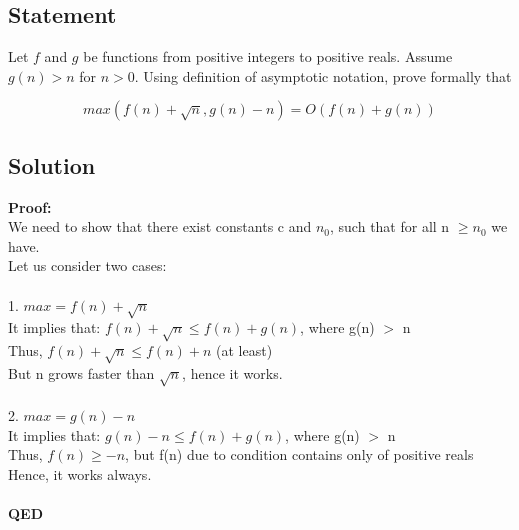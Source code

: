 \documentclass{article}
\begin{document}
\subsection{Statement}

Let \(f\) and \(g\) be functions from positive integers to positive reals. Assume \(g(n) > n\) for \(n > 0\). Using definition of asymptotic notation, prove formally that

\[max(f(n) + \sqrt{n}, g(n) - n) = O(f(n) + g(n))\]

\subsection{Solution}
\textbf{Proof:} \\

We need to show that there exist constants c and $n_0$, such that for all n $\geq n_0$ we have. \\
Let us consider two cases: \\ \\
1. $max = f(n) + \sqrt{n}$ \\
It implies that: $f(n) + \sqrt{n} \leq f(n) + g(n)$, where g(n) $>$ n \\
Thus, $f(n) + \sqrt{n} \leq f(n) + n$ (at least) \\
But n grows faster than $\sqrt{n}$, hence it works. \\ \\
2. $max = g(n) - n$ \\
It implies that: $g(n) - n \leq f(n) + g(n)$, where g(n) $>$ n \\
Thus, $f(n) \geq -n$, but f(n) due to condition contains only of positive reals \\
Hence, it works always. \\ \\
\textbf{QED}
\end{document}
